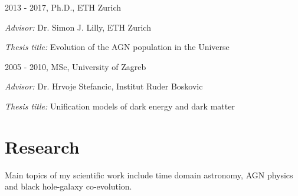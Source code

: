\documentclass[11pt,letterpaper]{article}
\renewenvironment{itemize}{
  \begin{list}{}{
    \setlength{\leftmargin}{1.5em}
    \setlength{\itemsep}{0.10em}
    \setlength{\parskip}{0pt}
    \setlength{\parsep}{0.10em}
  }
}{
  \end{list}
}
\begin{document}
\begin{itemize}
  \item 2013 - 2017, Ph.D., ETH Zurich
  \begin{itemize}
  \item \textit{Advisor:} Dr. Simon J. Lilly, ETH Zurich
\item \textit{Thesis title:} Evolution of the AGN population in the Universe

\end{itemize}  




  \item 2005 - 2010, MSc, University of Zagreb
  \begin{itemize}
            \item \textit{Advisor:}
      Dr. Hrvoje  Stefancic, Institut Ruder Boskovic
    \item  \textit{Thesis title:}
  Unification models of dark energy and dark matter 

\end{itemize}  
\end{itemize}

\section*{Research}
 Main topics of my scientific work include time domain astronomy, AGN physics and black hole-galaxy co-evolution. %
 
\end{document}
